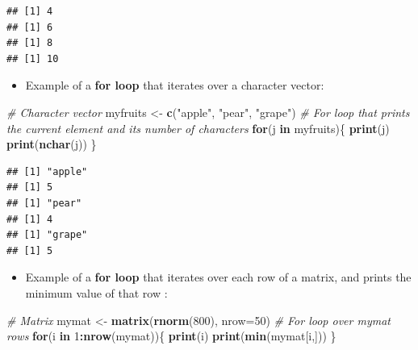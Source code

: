 \documentclass[]{book}
\newenvironment{Shaded}{\begin{snugshade}}{\end{snugshade}}
\newcommand{\CommentTok}[1]{\textcolor[rgb]{0.56,0.35,0.01}{\textit{#1}}}
\newcommand{\ControlFlowTok}[1]{\textcolor[rgb]{0.13,0.29,0.53}{\textbf{#1}}}
\newcommand{\DataTypeTok}[1]{\textcolor[rgb]{0.13,0.29,0.53}{#1}}
\newcommand{\DecValTok}[1]{\textcolor[rgb]{0.00,0.00,0.81}{#1}}
\newcommand{\KeywordTok}[1]{\textcolor[rgb]{0.13,0.29,0.53}{\textbf{#1}}}
\newcommand{\NormalTok}[1]{#1}
\newcommand{\OperatorTok}[1]{\textcolor[rgb]{0.81,0.36,0.00}{\textbf{#1}}}
\newcommand{\StringTok}[1]{\textcolor[rgb]{0.31,0.60,0.02}{#1}}
\providecommand{\tightlist}{%
  \setlength{\itemsep}{0pt}\setlength{\parskip}{0pt}}
\begin{document}
\begin{verbatim}
## [1] 4
## [1] 6
## [1] 8
## [1] 10
\end{verbatim}

\begin{itemize}
\tightlist
\item
  Example of a \textbf{for loop} that iterates over a character vector:
\end{itemize}

\begin{Shaded}
\begin{Highlighting}[]
\CommentTok{# Character vector}
\NormalTok{myfruits <-}\StringTok{ }\KeywordTok{c}\NormalTok{(}\StringTok{"apple"}\NormalTok{, }\StringTok{"pear"}\NormalTok{, }\StringTok{"grape"}\NormalTok{)}
\CommentTok{# For loop that prints the current element and its number of characters}
\ControlFlowTok{for}\NormalTok{(j }\ControlFlowTok{in}\NormalTok{ myfruits)\{}
    \KeywordTok{print}\NormalTok{(j)}
    \KeywordTok{print}\NormalTok{(}\KeywordTok{nchar}\NormalTok{(j))}
\NormalTok{\}}
\end{Highlighting}
\end{Shaded}

\begin{verbatim}
## [1] "apple"
## [1] 5
## [1] "pear"
## [1] 4
## [1] "grape"
## [1] 5
\end{verbatim}

\begin{itemize}
\tightlist
\item
  Example of a \textbf{for loop} that iterates over each row of a matrix, and prints the minimum value of that row :
\end{itemize}

\begin{Shaded}
\begin{Highlighting}[]
\CommentTok{# Matrix}
\NormalTok{mymat <-}\StringTok{ }\KeywordTok{matrix}\NormalTok{(}\KeywordTok{rnorm}\NormalTok{(}\DecValTok{800}\NormalTok{), }
    \DataTypeTok{nrow=}\DecValTok{50}\NormalTok{)}
\CommentTok{# For loop over mymat rows}
\ControlFlowTok{for}\NormalTok{(i }\ControlFlowTok{in} \DecValTok{1}\OperatorTok{:}\KeywordTok{nrow}\NormalTok{(mymat))\{}
    \KeywordTok{print}\NormalTok{(i)}
    \KeywordTok{print}\NormalTok{(}\KeywordTok{min}\NormalTok{(mymat[i,]))}
\NormalTok{\}}
\end{Highlighting}
\end{Shaded}
\end{document}
